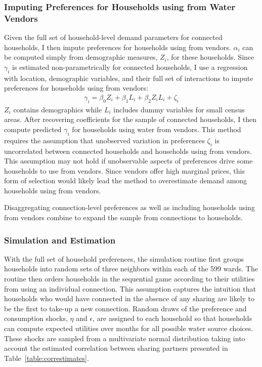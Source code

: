 \documentclass[12pt]{article}
\begin{document}
\subsubsection{Imputing Preferences for Households using from Water Vendors}

Given the full set of household-level demand parameters for connected households, I then impute preferences for households using from vendors.  $\alpha_i$ can be computed simply from demographic measures, $Z_i$, for these households.  Since $\gamma_i$ is estimated non-parametrically for connected households, I use a regression with location, demographic variables, and their full set of interactions to impute preferences for households using from vendors:
\begin{align*}
\gamma_i = \beta_0 Z_i + \beta_1 L_i + \beta_2 Z_i L_i + \zeta_i
\end{align*}
$Z_i$ contains demographics while $L_i$ includes dummy variables for small census areas.  After recovering coefficients for the sample of connected households, I then compute predicted $\gamma_i$ for households using water from vendors.  This method requires the assumption that unobserved variation in preferences $\zeta_i$ is uncorrelated between connected households and households using from vendors.  This assumption may not hold if unobservable aspects of preferences drive some households to use from vendors.  Since vendors offer high marginal prices, this form of selection would likely lead the method to overestimate demand among households using from vendors.  

Disaggregating connection-level preferences as well as including households using from vendors combine to expand the sample from  connections to households.  

\subsubsection{Simulation and Estimation}



With the full set of household preferences, the simulation routine first groups households into random sets of three neighbors within each of the 599 wards.  The routine then orders households in the sequential game according to their utilities from using an individual connection.  This assumption captures the intuition that households who would have connected in the absence of any sharing are likely to be the first to take-up a new connection.  Random draws of the preference and consumption shocks, $\eta$ and $\epsilon$, are assigned to each household so that households can compute expected utilities over months for all possible water source choices.  These shocks are sampled from a multivariate normal distribution taking into account the estimated correlation between sharing partners presented in Table~\ref{table:correstimates}.  
\end{document}
